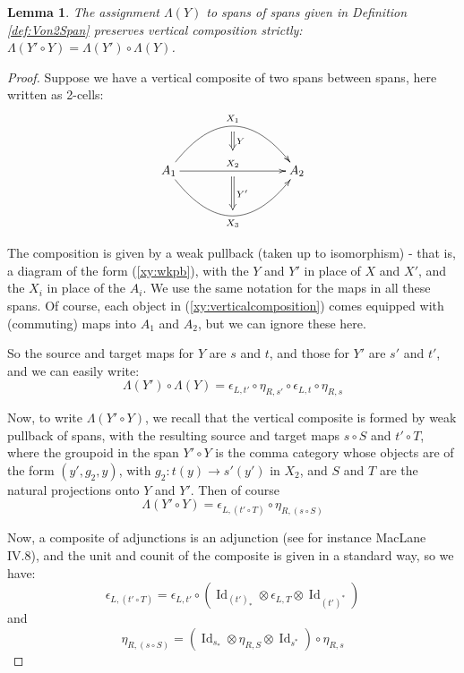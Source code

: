 \documentclass[10pt]{amsart}
\numberwithin{theorem}{subsection}
\newtheorem{lemma}[theorem]{Lemma}
\newcommand{\ra}{\mathop{\rightarrow}}
\newcommand{\opname}[1]{\operatorname{#1}}
\newcommand{\Id}{\opname{Id}}
\newcommand{\FV}{\Lambda}
\begin{document}
\begin{lemma}\label{thm:vertcompos}The assignment $\FV(Y)$ to spans of spans
given in Definition \ref{def:Von2Span} preserves vertical composition strictly:
$\FV(Y' \circ Y) = \FV(Y') \circ \FV(Y)$.
\end{lemma}
\begin{proof}
Suppose we have a vertical composite of two spans between spans, here
written as 2-cells:
\begin{equation}\label{xy:verticalcomposition}
\xymatrix{
A_1 \ar@/^3pc/[rrr]^{X_1}="1" \ar[rrr]^{X_2}="2" \ar@/_3pc/[rrr]_{X_3}="3" & & & A_2 \\
 {\ar@{=>}"1"+<0ex,-2.5ex> ;"2"+<0ex,+2.5ex>^{Y}}
 {\ar@{=>}"2"+<0ex,-2.5ex> ;"3"+<0ex,+2.5ex>^{Y'}}
}
\end{equation}

The composition is given by a weak pullback (taken up to isomorphism)
- that is, a diagram of the form (\ref{xy:wkpb}), with the $Y$ and
$Y'$ in place of $X$ and $X'$, and the $X_i$ in place of the $A_i$.
We use the same notation for the maps in all these spans.  Of course,
each object in (\ref{xy:verticalcomposition}) comes equipped with
(commuting) maps into $A_1$ and $A_2$, but we can ignore these here.

So the source and target maps for $Y$ are $s$ and $t$, and those for
$Y'$ are $s'$ and $t'$, and we can easily write:
\begin{equation}
\FV(Y') \circ \FV(Y) = \epsilon_{L,t'} \circ \eta_{R,s'} \circ \epsilon_{L,t} \circ \eta_{R,s}
\end{equation}

Now, to write $\FV(Y' \circ Y)$, we recall that the vertical composite
is formed by weak pullback of spans, with the resulting source and
target maps $s \circ S$ and $t' \circ T$, where the groupoid in the
span $Y' \circ Y$ is the comma category whose objects are of the form
$(y',g_2,y)$, with $g_2 : t(y) \ra s'(y')$ in $X_2$, and $S$ and $T$
are the natural projections onto $Y$ and $Y'$.  Then of course
\begin{equation}
\FV(Y' \circ Y) = \epsilon_{L,(t' \circ T)} \circ \eta_{R,(s \circ S)}
\end{equation}

Now, a composite of adjunctions is an adjunction (see for instance
MacLane \cite{maclane} IV.8), and the unit and counit of the composite is
given in a standard way, so we have:
\begin{equation}
\epsilon_{L,(t' \circ T)} = \epsilon_{L,t'} \circ (\Id_{(t')_{\ast}} \otimes \epsilon_{L,T} \otimes \Id_{(t')^{\ast}})
\end{equation}
and
\begin{equation}
\eta_{R,(s \circ S)} = (\Id_{s_{\ast}} \otimes \eta_{R,S} \otimes \Id_{s^{\ast}}) \circ \eta_{R,s}
\end{equation}


\end{proof}
\end{document}
